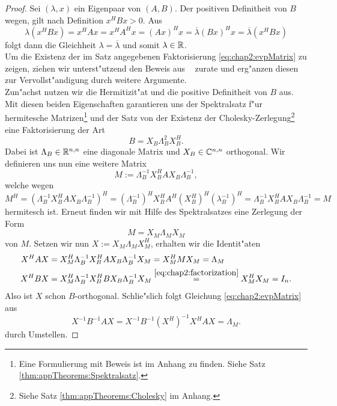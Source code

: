 \begin{proof}
Sei $(\lambda,x)$ ein Eigenpaar von $(A,B)$. Der positiven Definitheit von $B$ wegen, gilt nach Definition $x^H B x > 0$. Aus
\[
\lambda (x^H B x) = x^H Ax = x^H A^H x = (Ax)^H x
= \overline{\lambda} (Bx)^H x = \overline{\lambda} (x^H B x)
\]
folgt dann die Gleichheit $\lambda = \overline{\lambda}$ und somit $\lambda\in\mathbb{R}$.\\

 Um die Existenz der im Satz angegebenen Faktorisierung \eqref{eq:chap2:evpMatrix}
zu zeigen, ziehen wir unterst"utzend den Beweis aus ~\cite[Theorem 15.3.2, 344 f.]{parlett} zurate und erg"anzen diesen zur Vervollst"andigung durch weitere Argumente.\\


Zun"achst nutzen wir die Hermitizit"at und die positive Definitheit von $B$ aus. Mit diesen beiden Eigenschaften garantieren uns der Spektralsatz f"ur hermitesche Matrizen\footnote{Eine Formulierung mit Beweis ist im Anhang zu finden. Siehe Satz \ref{thm:appTheorems:Spektralsatz}.}
und der Satz von der Existenz der Cholesky-Zerlegung\footnote{Siehe Satz \ref{thm:appTheorems:Cholesky} im Anhang.} eine Faktorisierung der Art
\begin{equation}\label{eq:chap2:factorization}
B = X_B \Lambda_B^2 X_B^H.
\end{equation}
Dabei ist $\Lambda_B\in\mathbb{R}^{n,n}$ eine diagonale Matrix und $X_B \in \mathbb{C}^{n,n}$ orthogonal.
Wir definieren uns nun eine weitere Matrix
\[
M:= \Lambda_B^{-1} X_B^H A X_B \Lambda_B^{-1},
\]
welche wegen
\[
M^H = \left(\Lambda_B^{-1} X_B^H A X_B \Lambda_B^{-1}\right)^H
= (\Lambda_B^{-1})^{H} X_B^H A^H (X_B^H)^H (\lambda_B^{-1})^H
= \Lambda_B^{-1} X_B^H A X_B \Lambda_B^{-1}
= M
\]
hermitesch ist. Erneut finden wir mit Hilfe des Spektralsatzes eine Zerlegung der Form
\[
M = X_M \Lambda_M X_M
\]
von $M$. Setzen wir nun $X:=X_M \Lambda_M X_M^H$, erhalten wir die Identit"aten
\begin{align*}
X^H A X &= X_M^H \Lambda_B^{-1} X_B^H A X_B \Lambda_B^{-1} X_M = X_M^H M X_M = \Lambda_M\\
X^H B X &= X_M^H \Lambda_B^{-1} X_B^H B X_B \Lambda_B^{-1} X_M \overset{\eqref{eq:chap2:factorization}}{=} X_M^H X_M = I_n.
\end{align*}
Also ist $X$ schon $B$-orthogonal. Schlie"slich folgt Gleichung \eqref{eq:chap2:evpMatrix} aus
\[
X^{-1}B^{-1}AX = X^{-1}B^{-1} (X^H)^{-1} X^H AX = \Lambda_M.
\]
durch Umstellen.
\end{proof}

